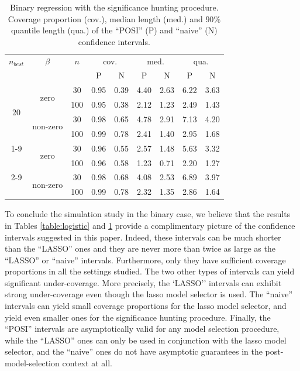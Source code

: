 \documentclass[preprint]{imsart}
\numberwithin{equation}{section}
\begin{document}
\begin{table}[tbp]
\begin{center}
\begin{tabular}{c|c|c|cc|cc|cc}
$n_{best}$ & $\beta$  & $n$ & \multicolumn{2}{c}{cov.} &
\multicolumn{2}{c}{med.} & 
\multicolumn{2}{c}{qua.} \\ 
& & & P & N & P & N & P & N \\ \hline
\multirow{4}{*}{20} & 
\multirow{2}{*}{zero} & 
30 & 0.95& 0.39& 4.40& 2.63& 6.22& 3.63  \\ 
 & 
 & 
100 & 0.95 &0.38 &2.12 &1.23& 2.49& 1.43  \\ \cline{2-9}
 & 
\multirow{2}{*}{non-zero} & 
30 & 0.98 &0.65& 4.78& 2.91& 7.13& 4.20  \\ 
 & 
 & 
100 & 0.99& 0.78 &2.41 &1.40 &2.95 &1.68  \\ \cline{1-9}
\multirow{4}{*}{5} & 
\multirow{2}{*}{zero} & 
30 & 0.96 &0.55 &2.57& 1.48 &5.63 &3.32  \\ 
 & 
 & 
100 &  0.96 &0.58& 1.23 &0.71& 2.20& 1.27 \\ \cline{2-9}
 & 
\multirow{2}{*}{non-zero} & 
30 & 0.98& 0.68& 4.08& 2.53 &6.89 &3.97 \\ 
 & 
 & 
100 & 0.99 &0.78 &2.32& 1.35& 2.86 &1.64  \\ 
\end{tabular}%
\end{center}
\caption{Binary regression with the significance hunting procedure. Coverage proportion (cov.), median length (med.) and $90\%$ quantile length (qua.) of the ``POSI'' (P) and ``naive'' (N) confidence intervals. }
\label{table:logistic:significance:hunting}
\end{table}


To conclude the simulation study in the binary case, we believe that the results in Tables \ref{table:logistic} and \ref{table:logistic:significance:hunting} provide a complimentary picture of the confidence intervals suggested in this paper. Indeed, these intervals can be much shorter than the ``LASSO'' ones and they are never more than twice as large as the ``LASSO'' or ``naive'' intervals. Furthermore, only they have sufficient coverage proportions in all the settings studied. The two other types of intervals can yield significant under-coverage. More precisely, the `LASSO'' intervals can exhibit strong under-coverage even though the lasso model selector is used. The ``naive'' intervals can yield small coverage proportions for the lasso model selector, and yield even smaller ones for the significance hunting procedure.
Finally, the ``POSI'' intervals are asymptotically valid for any model selection procedure, while the ``LASSO'' ones can only be used in conjunction with the lasso model selector, and the ``naive'' ones do not have asymptotic guarantees in the post-model-selection context at all.
\end{document}
